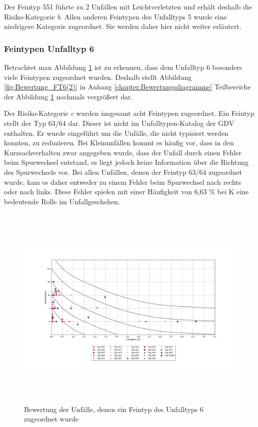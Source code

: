 Der Feintyp 551 führte zu 2 Unfällen mit Leichtverletzten und erhält deshalb die Risiko-Kategorie \textit{b}. Allen anderen Feintypen des Unfalltyps 5 wurde eine niedrigere Kategorie zugeordnet. Sie werden daher hier nicht weiter erläutert.

\subsubsection{Feintypen Unfalltyp 6}
Betrachtet man Abbildung \ref{fig:Bewertung_FT6} ist zu erkennen, dass dem Unfalltyp 6 besonders viele Feintypen zugeordnet wurden. Deshalb stellt Abbildung \ref{fig:Bewertung_FT6(2)} in Anhang \ref{chapter:Bewertungsdiagramme} Teilbereiche der Abbildung \ref{fig:Bewertung_FT6} nochmals vergrößert dar.

Der Risiko-Kategorie \textit{c} wurden insgesamt acht Feintypen zugeordnet. Ein Feintyp stellt der Typ 63/64 dar. Dieser ist nicht im Unfalltypen-Katalog der GDV enthalten. Er wurde eingeführt um die Unfälle, die nicht typisiert werden konnten, zu reduzieren. Bei Kleinunfällen kommt es häufig vor, dass in den Kurzsachverhalten zwar angegeben wurde, dass der Unfall durch einen Fehler beim Spurwechsel entstand, es liegt jedoch keine Information über die Richtung des Spurwechsels vor. Bei allen Unfällen, denen der Feintyp 63/64 zugeordnet wurde, kam es daher entweder zu einem Fehler beim Spurwechsel nach rechts oder nach links. Diese Fehler spielen mit einer Häufigkeit von 6,63 \% bei \ac{K} eine bedeutende Rolle im Unfallgeschehen.

\begin{savenotes}
	\begin{figure}[H]
		\centering
		\includegraphics[width=18cm,height=10cm]{figures/Bewertung_FT6}
		\caption[Bewertung der Unfälle, denen ein Feintyp des Unfalltyps 6 zugeordnet wurde]{Bewertung der Unfälle, denen ein Feintyp des Unfalltyps 6 zugeordnet wurde}\label{fig:Bewertung_FT6}
	\end{figure}
\end{savenotes}

